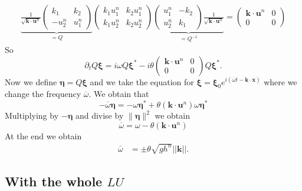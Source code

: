 \documentclass[a4paper, 11pt]{article}
\begin{document}
\begin{equation*}
\begin{split}
\underbrace{\frac{1}{\sqrt{\boldsymbol{k}\cdot \boldsymbol{u}^n}}
\begin{pmatrix}
k_1&k_2\\-u_2^n&u_1^n
\end{pmatrix}}_{=Q}\begin{pmatrix}k_1u_1^n&k_2u_1^n\\k_1u_2^n&k_2u_2^n\end{pmatrix}\underbrace{\begin{pmatrix}u_1^n&-k_2\\u_2^n&k_1\end{pmatrix}\frac{1}{\sqrt{\boldsymbol{k}\cdot \boldsymbol{u}^n}}}_{=Q^{-1}}=\begin{pmatrix}\boldsymbol{k}\cdot \boldsymbol{u}^n&0\\0&0\end{pmatrix}
\end{split}
\end{equation*}
So \begin{equation*}
\partial_t Q\boldsymbol{\xi}=i\omega Q\boldsymbol{\xi}^*-i\theta\begin{pmatrix}\boldsymbol{k}\cdot \boldsymbol{u}^n&0\\0&0\end{pmatrix}Q\boldsymbol{\xi}^*.
\end{equation*}
Now we define $\boldsymbol{\eta}=Q\boldsymbol{\xi}$  and we take the equation for $\boldsymbol{\xi}=\boldsymbol{\xi}_0e^{i(\overline{\omega} t-\boldsymbol{k}\cdot \boldsymbol{x})}$ where we change the frequency $\overline{\omega}$. We obtain that
\begin{equation*}
- \overline{\omega} \boldsymbol{\eta}=- \omega\boldsymbol{\eta}^*+\theta(\boldsymbol{k}\cdot \boldsymbol{u}^n) \omega \boldsymbol{\eta}^*\end{equation*}
Multiplying by  $-\boldsymbol{\eta}$ and divise by  $\parallel\boldsymbol{\eta}\parallel^2$ we obtain
$$
\overline{\omega}=\omega -\theta(\boldsymbol{k}\cdot \boldsymbol{u}^n)
$$
At the end we obtain
\begin{align*}
\bar{\omega} &=\pm\theta\sqrt{gh^n}||\boldsymbol{k}||.
\end{align*}

\subsection{With the whole $LU$}
\end{document}
